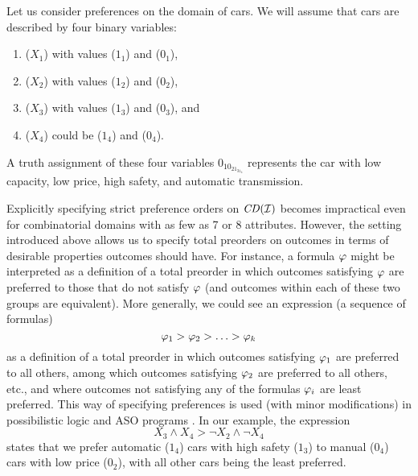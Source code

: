Let us consider preferences on the domain of cars. 
We will assume that cars are described by 
four binary variables: 
\begin{enumerate}  %
\item {} ($X_1$) with values  ($1_1$) and 
 ($0_1$),
\item {} ($X_2$) with values  ($1_2$) and 
 ($0_2$),
\item {} ($X_3$) with values  ($1_3$) and 
 ($0_3$), and
\item {} ($X_4$) could be  ($1_4$)
and  ($0_4$).
\end{enumerate}
A truth assignment of these four variables $0_10_21_31_4$
represents the car with low capacity, low price,
high safety, and automatic transmission.


Explicitly specifying strict preference orders on $\mathit{CD}(\mathcal{I})$ becomes 
impractical even for combinatorial domains with as few as 7 or 8 attributes. 
However, 
the setting introduced above allows us to specify total preorders on
outcomes in terms of desirable properties outcomes should have. For 
instance, a formula $\mathit{\varphi}$ might be interpreted as a definition of
a total preorder in which outcomes satisfying $\mathit{\varphi}$ are preferred to
those that do not satisfy $\mathit{\varphi}$ (and outcomes within each of these
two groups are equivalent). More generally, we could see an expression
(a sequence of formulas)
\[
\mathit{\varphi}_1> \mathit{\varphi}_2>\ldots>\mathit{\varphi}_k
\]
as a definition of a total preorder in which outcomes satisfying $\mathit{\varphi}_1$
are preferred to all others, among which outcomes satisfying $\mathit{\varphi}_2$ are
preferred to all others, etc., and where outcomes not satisfying any of the 
formulas $\mathit{\varphi}_i$ are least preferred. This way of specifying preferences 
is used
(with minor modifications) in possibilistic logic \cite{DuboisLP91} and 
ASO programs \cite{Brewka:ASO}.
In our example, the expression
\[
X_3 \land X_4 > \neg X_2 \land \neg X_4 
\]
states that we prefer automatic ($1_4$) cars with high safety ($1_3$)
to manual ($0_4$) cars with low price ($0_2$), with all 
other cars being the least preferred.

